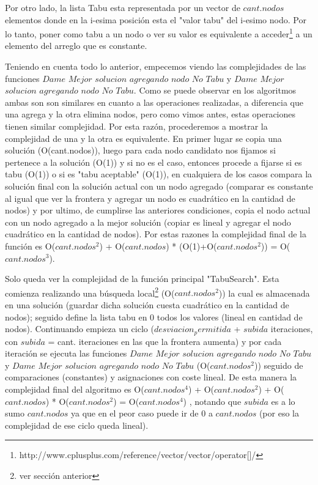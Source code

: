  Por otro lado, la lista Tabu esta representada por un vector de $cant.nodos$ elementos donde en la i-esima posición esta el "valor tabu" del i-esimo nodo. Por lo tanto, poner como tabu a un nodo o ver su valor es equivalente a acceder\footnote{http://www.cplusplus.com/reference/vector/vector/operator[]/} a un elemento del arreglo que es constante.\newline

 Teniendo en cuenta todo lo anterior, empecemos viendo las complejidades de las funciones $Dame$ $Mejor$ $solucion$ $agregando$ $nodo$ $No$ $Tabu$ y $Dame$ $Mejor$ $solucion$ $agregando$ $nodo$ $No$ $Tabu$. Como se puede observar en los algoritmos ambas son son similares en cuanto a las operaciones realizadas, a diferencia que una agrega y la otra elimina nodos, pero como vimos antes, estas operaciones tienen similar complejidad. Por esta razón, procederemos a mostrar la complejidad de una y la otra es equivalente.\newline
 En primer lugar se copia una solución (O(cant.nodos)), luego para cada nodo candidato nos fijamos si pertenece a la solución (O(1)) y si no es el caso, entonces procede a fijarse si es tabu (O(1)) o si es "tabu aceptable" (O(1)), en cualquiera de los casos compara la solución final con la solución actual con un nodo agregado (comparar es constante al igual que ver la frontera y agregar un nodo es cuadrático en la cantidad de nodos) y por ultimo, de cumplirse las anteriores condiciones, copia el nodo actual con un nodo agregado a la mejor solución (copiar es lineal y agregar el nodo cuadrático en la cantidad de nodos). \newline
 Por estas razones la complejidad final de la función es O($cant.nodos$$^{2}$) + O($cant.nodos$) * (O(1)+O($cant.nodos$$^{2}$)) = O($cant.nodos$$^{3}$).\newline

 Solo queda ver la complejidad de la función principal "TabuSearch". Esta comienza realizando una búsqueda local\footnote{ver sección anterior} (O($cant.nodos$$^{2}$)) la cual es almacenada en una solución (guardar dicha solución cuesta cuadrático en la cantidad de nodos); seguido define la lista tabu en 0 todos los valores (lineal en cantidad de nodos). Continuando empieza un ciclo ($desviacion_permitida$ + $subida$ iteraciones, con $subida$ = cant. iteraciones en las que la frontera aumenta) y por cada iteración se ejecuta las funciones $Dame$ $Mejor$ $solucion$ $agregando$ $nodo$ $No$ $Tabu$ y $Dame$ $Mejor$ $solucion$ $agregando$ $nodo$ $No$ $Tabu$ (O($cant.nodos$$^{2}$)) seguido de comparaciones (constantes) y asignaciones con coste lineal. \newline
 De esta manera la complejidad final del algoritmo es O($cant.nodos$$^{4}$) + O($cant.nodos$$^{2}$) + O($cant.nodos$) * O($cant.nodos$$^{2}$) = O($cant.nodos$$^{4}$) , notando que $subida$ es a lo sumo $cant.nodos$ ya que en el peor caso puede ir de 0 a $cant.nodos$ (por eso la complejidad de ese ciclo queda lineal). 


